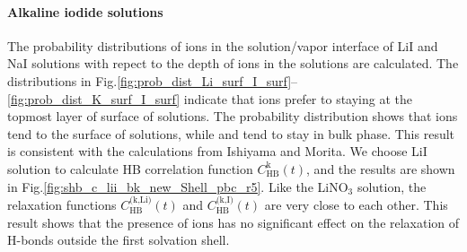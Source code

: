 \paragraph{Alkaline iodide solutions}
The probability distributions of ions in the solution/vapor interface of LiI and NaI solutions with repect to the depth 
of ions in the solutions %
are calculated. 
The distributions in Fig.\thinspace\ref{fig:prob_dist_Li_surf_I_surf}--\ref{fig:prob_dist_K_surf_I_surf} indicate
that \I ions prefer to staying at the topmost layer of surface of solutions.
The probability distribution shows that \I ions tend to the surface of solutions, while \Na and \Li tend to stay in bulk phase. 
This result is consistent with the calculations from Ishiyama and Morita\cite{TI07,Ishiyama2014}.
We choose LiI solution to calculate HB correlation function $C^\text{k}_\text{HB}(t)$,
and the results are shown in Fig.\ref{fig:shb_c_lii_bk_new_Shell_pbc_r5}. 
Like the LiNO$_3$ solution, the relaxation functions $C^\text{(k,Li)}_\text{HB}(t)$ and 
$C^\text{(k,I)}_\text{HB}(t)$ are very close to each other. 
This result shows that the presence of ions has no significant effect on the relaxation of H-bonds outside the first solvation shell.


